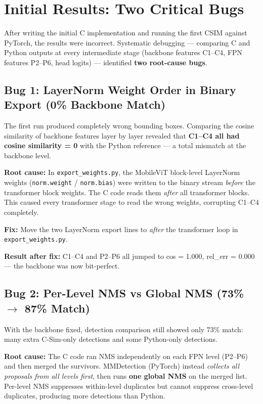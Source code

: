 \section{Initial Results: Two Critical Bugs}

After writing the initial C implementation and running the first CSIM against PyTorch, the results were incorrect. Systematic debugging — comparing C and Python outputs at every intermediate stage (backbone features C1--C4, FPN features P2--P6, head logits) — identified \textbf{two root-cause bugs}.

\subsection{Bug 1: LayerNorm Weight Order in Binary Export (0\% Backbone Match)}

The first run produced completely wrong bounding boxes. Comparing the cosine similarity of backbone features layer by layer revealed that \textbf{C1--C4 all had cosine similarity = 0} with the Python reference — a total mismatch at the backbone level.

\textbf{Root cause:} In \texttt{export\_weights.py}, the MobileViT block-level LayerNorm weights (\texttt{norm.weight} / \texttt{norm.bias}) were written to the binary stream \textit{before} the transformer block weights. The C code reads them \textit{after} all transformer blocks. This caused every transformer stage to read the wrong weights, corrupting C1--C4 completely.

\textbf{Fix:} Move the two LayerNorm export lines to \textit{after} the transformer loop in \texttt{export\_weights.py}.

\textbf{Result after fix:} C1--C4 and P2--P6 all jumped to cos = 1.000, rel\_err = 0.000 — the backbone was now bit-perfect.

\subsection{Bug 2: Per-Level NMS vs Global NMS (73\% $\rightarrow$ 87\% Match)}

With the backbone fixed, detection comparison still showed only 73\% match: many extra C-Sim-only detections and some Python-only detections.

\textbf{Root cause:} The C code ran NMS independently on each FPN level (P2--P6) and then merged the survivors. MMDetection (PyTorch) instead \textit{collects all proposals from all levels first}, then runs \textbf{one global NMS} on the merged list. Per-level NMS suppresses within-level duplicates but cannot suppress cross-level duplicates, producing more detections than Python.

